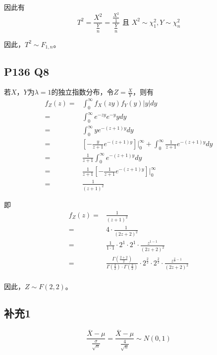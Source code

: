 \documentclass[a4paper,12pt]{ctexart}
\begin{document}
因此有
\begin{equation*}
	T^2 = \frac{X^2}{\frac{Y}{n}} = \frac{\frac{X^2}{1}}{\frac{Y}{n}} \text{ 且 } X^2 \sim \chi^2_1, Y \sim \chi^2_n
\end{equation*}

因此，$T^2 \sim F_{1, n}$。

\subsection*{P136 Q8}

若$X$，$Y$为$\lambda = 1$的独立指数分布，令$Z = \frac{X}{Y}$，则有
\begin{align*}
	f_Z(z) =& \int_0^{\infty} f_X(zy) f_Y(y) |y| dy \\
	=& \int_0^{\infty} e^{-zy} e^{-y} y dy \\
	=& \int_0^{\infty} y e^{-(z+1)y} dy \\
	=& \left[-\frac{y}{z+1} e^{-(z+1)y}\right] \Big|_0^{\infty} + \int_0^{\infty} \frac{1}{z+1} e^{-(z+1)y} dy \\
	=& \frac{1}{z+1} \int_0^{\infty} e^{-(z+1)y} dy \\
	=& \frac{1}{z+1} \left[-\frac{1}{z+1} e^{-(z+1)y}\right] \Big|_0^{\infty} \\
	=& \frac{1}{(z+1)^2}
\end{align*}

即
\begin{align*}
	f_Z(z) =& \frac{1}{(z+1)^2} \\
	=& 4 \cdot \frac{1}{(2z+2)^2} \\
	=& \frac{1}{1 \cdot 1} \cdot 2^1 \cdot 2^1 \cdot \frac{z^{1-1}}{(2z+2)^2} \\
	=& \frac{\Gamma(\frac{2+2}{2})}{\Gamma(\frac{2}{2}) \cdot \Gamma(\frac{2}{2})} \cdot 2^{\frac{2}{2}} \cdot 2^{\frac{2}{2}} \cdot \frac{z^{\frac{2}{2}-1}}{(2z+2)^2} \\
\end{align*}

因此，$Z \sim F(2, 2)$。

\subsection*{补充1}

\begin{equation*}
	\frac{\overline{X} - \mu}{\frac{\sigma}{\sqrt{n}}} = \frac{\overline{X} - \mu}{\frac{4}{\sqrt{n}}} \sim N(0, 1)
\end{equation*}
\end{document}
